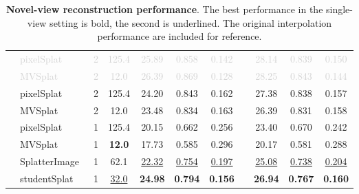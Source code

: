 \begin{table}[t!]
\begin{center}
\begin{tabular}{l@{}l c c ccc c ccc@{}}
     & \textcolor{lightgray}{pixelSplat}~\scriptsize{\cite{charatan2024pixelsplat}} & \textcolor{lightgray}{2} & \textcolor{lightgray}{125.4}  & \textcolor{lightgray}{25.89} & \textcolor{lightgray}{0.858} & \textcolor{lightgray}{0.142} && \textcolor{lightgray}{28.14} & \textcolor{lightgray}{0.839} & \textcolor{lightgray}{0.150} \\
     & \textcolor{lightgray}{MVSplat}~\scriptsize{\cite{chen2024mvsplat}} &\textcolor{lightgray}{2} & \textcolor{lightgray}{12.0} & \textcolor{lightgray}{26.39} & \textcolor{lightgray}{0.869} & \textcolor{lightgray}{0.128} && \textcolor{lightgray}{28.25} & \textcolor{lightgray}{0.843} & \textcolor{lightgray}{0.144}  \\
    \midrule
    \parbox[t]{4mm}{}
     & pixelSplat~\scriptsize{\cite{charatan2024pixelsplat}} & 2 & 125.4  & {24.20} & {0.843} & {0.162} && {27.38} & 0.838 & {0.157} \\
     & {MVSplat}~\scriptsize{\cite{chen2024mvsplat}} & 2 & {12.0} & {23.48} & {0.834} & {0.163} && {26.39} & {0.831} & {0.158}  \\
     & pixelSplat~\scriptsize{\cite{charatan2024pixelsplat}} & 1 & 125.4  & 20.15 & 0.662 & 0.256 && 23.40 & 0.670 & 0.242 \\
     & {MVSplat}~\scriptsize{\cite{chen2024mvsplat}} & 1 & \textbf{12.0} & {17.73} & {0.585} & {0.296} && {20.17} & {0.581} & {0.288}  \\
     & {SplatterImage}~\scriptsize{\cite{szymanowicz2024splatter}} & 1 & 62.1 & \underline{22.32} & \underline{0.754} & \underline{0.197} && \underline{25.08} & \underline{0.738} & \underline{0.204}  \\
     & studentSplat & 1 & \underline{32.0} & \textbf{24.98} & \textbf{0.794} & \textbf{0.156} && \textbf{26.94} & \textbf{0.767} & \textbf{0.160}  \\
    \bottomrule
    \end{tabular}
    \end{center}
    \caption{\textbf{Novel-view reconstruction performance}. The best performance in the single-view setting is bold, the second is underlined. The original interpolation performance are included for reference.
    }
    \label{tab:sota_compare}
    \vspace{-0.4cm}
\end{table}




